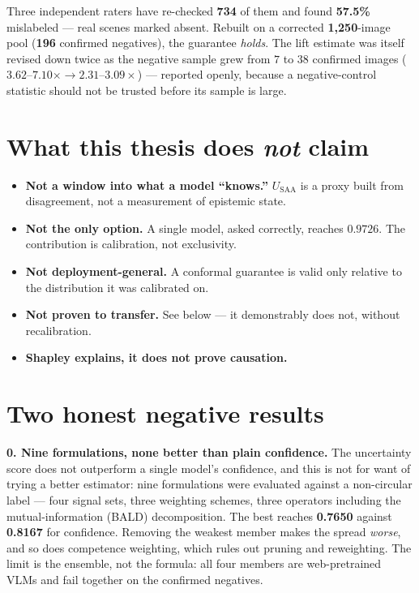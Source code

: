 \documentclass[10pt,a4paper]{article}
\newcommand{\num}[1]{\textbf{#1}}
\begin{document}
Three independent raters have re-checked \num{734} of them and found \num{57.5\%} mislabeled --- real scenes marked absent. Rebuilt on a corrected \num{1{,}250}-image pool (\num{196} confirmed negatives), the guarantee \emph{holds}. The lift estimate was itself revised down twice as the negative sample grew from $7$ to $38$ confirmed images ($3.62$--$7.10\times \rightarrow 2.31$--$3.09\times$) --- reported openly, because a negative-control statistic should not be trusted before its sample is large.

\section{What this thesis does \emph{not} claim}
\begin{itemize}
  \item \textbf{Not a window into what a model ``knows.''} $U_{\text{SAA}}$ is a proxy built from disagreement, not a measurement of epistemic state.
  \item \textbf{Not the only option.} A single model, asked correctly, reaches $0.9726$. The contribution is calibration, not exclusivity.
  \item \textbf{Not deployment-general.} A conformal guarantee is valid only relative to the distribution it was calibrated on.
  \item \textbf{Not proven to transfer.} See below --- it demonstrably does not, without recalibration.
  \item \textbf{Shapley explains, it does not prove causation.}
\end{itemize}

\section{Two honest negative results}
\textbf{0. Nine formulations, none better than plain confidence.} The uncertainty score does not outperform a single model's confidence, and this is not for want of trying a better estimator: nine formulations were evaluated against a non-circular label --- four signal sets, three weighting schemes, three operators including the mutual-information (BALD) decomposition. The best reaches \num{0.7650} against \num{0.8167} for confidence. Removing the weakest member makes the spread \emph{worse}, and so does competence weighting, which rules out pruning and reweighting. The limit is the ensemble, not the formula: all four members are web-pretrained VLMs and fail together on the confirmed negatives.
\end{document}
